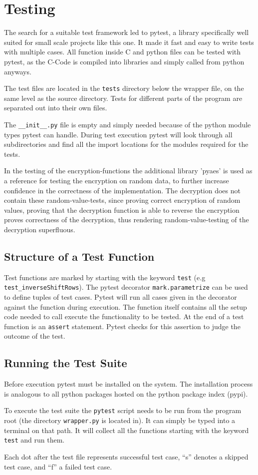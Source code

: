 \section{Testing}
The search for a suitable test framework led to pytest, a library specifically well suited for small scale projects like this one. It made it fast and easy to write tests with multiple cases. All function inside C and python files can be tested with pytest, as the C-Code is compiled into libraries and simply called from python anyways. \cite{pytest}

The test files are located in the \lstinline|tests| directory below the wrapper file, on the same level as the source directory. Tests for different parts of the program are separated out into their own files.

The \lstinline|__init__.py| file is empty and simply needed because of the python module types pytest can handle. During test execution pytest will look through all subdirectories and find all the import locations for the modules required for the tests.

In the testing of the encryption-functions the additional library 'pyaes' is used as a reference for testing the encryption on random data, to further increase confidence in the correctness  of the implementation. The decryption does not contain these random-value-tests, since proving correct encryption of random values, proving that the decryption function is able to reverse the encryption proves correctness of the decryption, thus rendering random-value-testing of the decryption superfluous.

\subsection{Structure of a Test Function}
Test functions are marked by starting with the keyword \lstinline|test| (e.g \lstinline|test_inverseShiftRows|). The pytest decorator \lstinline|mark.parametrize| can be used to define tuples of test cases. Pytest will run all cases given in the decorator against the function during execution. The function itself contains all the setup code needed to call execute the functionality to be tested. At the end of a test function is an \lstinline|assert| statement. Pytest checks for this assertion to judge the outcome of the test. 


\subsection{Running the Test Suite}
Before execution pytest must be installed on the system. The installation process is analogous to all python packages hosted on the python package index (pypi).

To execute the test suite the \lstinline|pytest| script needs to be run from the program root (the directory \lstinline|wrapper.py| is located in). It can simply be typed into a terminal on that path. It will collect all the functions starting with the keyword \lstinline|test| and run them.

Each dot after the test file represents successful test case, \enquote{s} denotes a skipped test case, and \enquote{f} a failed test case.

